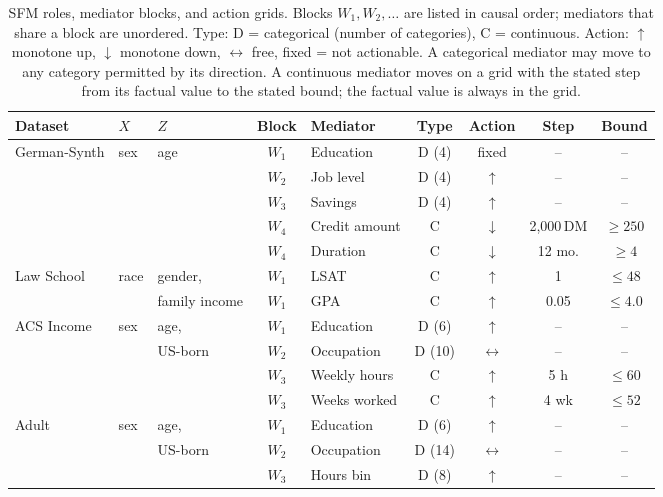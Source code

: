 \begin{table}[t]
\centering
\small
\caption{SFM roles, mediator blocks, and action grids. Blocks $W_1,W_2,\ldots$
are listed in causal order; mediators that share a block are unordered.
Type: D = categorical (number of categories), C = continuous. Action:
$\uparrow$ monotone up, $\downarrow$ monotone down, $\leftrightarrow$ free,
fixed = not actionable. A categorical mediator may move to any category
permitted by its direction. A continuous mediator moves on a grid with the
stated step from its factual value to the stated bound; the factual value is
always in the grid.}
\label{tab:roles}
\setlength{\tabcolsep}{4pt}
\begin{tabular}{lll c l c c c c}
\hline
Dataset & $X$ & $Z$ & Block & Mediator & Type & Action & Step & Bound \\
\hline
German-Synth & sex & age & $W_1$ & Education     & D (4)  & fixed            & --      & -- \\
             &     &     & $W_2$ & Job level     & D (4)  & $\uparrow$       & --      & -- \\
             &     &     & $W_3$ & Savings       & D (4)  & $\uparrow$       & --      & -- \\
             &     &     & $W_4$ & Credit amount & C      & $\downarrow$     & 2{,}000\,DM & $\ge 250$ \\
             &     &     & $W_4$ & Duration      & C      & $\downarrow$     & 12 mo.  & $\ge 4$ \\
\hline
Law School   & race & gender, & $W_1$ & LSAT       & C      & $\uparrow$       & 1       & $\le 48$ \\
             &      & family income & $W_1$ & GPA  & C      & $\uparrow$       & 0.05    & $\le 4.0$ \\
\hline
ACS Income   & sex & age,     & $W_1$ & Education     & D (6)  & $\uparrow$       & --      & -- \\
             &     & US-born  & $W_2$ & Occupation    & D (10) & $\leftrightarrow$ & --     & -- \\
             &     &          & $W_3$ & Weekly hours  & C      & $\uparrow$       & 5 h     & $\le 60$ \\
             &     &          & $W_3$ & Weeks worked  & C      & $\uparrow$       & 4 wk    & $\le 52$ \\
\hline
Adult        & sex & age,     & $W_1$ & Education     & D (6)  & $\uparrow$       & --      & -- \\
             &     & US-born  & $W_2$ & Occupation    & D (14) & $\leftrightarrow$ & --     & -- \\
             &     &          & $W_3$ & Hours bin     & D (8)  & $\uparrow$       & --      & -- \\
\hline
\end{tabular}
\end{table}

